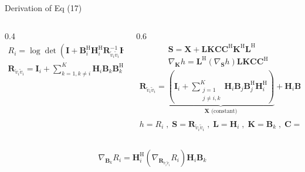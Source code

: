 \documentclass[aspectratio=169, 10pt]{beamer}
\begin{document}
\begin{frame}[label=app-wsr_Ri2]{Derivation of Eq (17)}
    \begin{columns}
        \begin{column}{0.4\paperwidth}
            \begin{align*}
                R_i = \log \det \left(\mathbf{I} + \mathbf{B}_i^\mathrm{H} \mathbf{H}_i^\mathrm{H} \mathbf{R}_{\tilde{v}_i\tilde{v}_i}^{-1} \mathbf{H}_i \mathbf{B}_i\right) \\
                \mathbf{R}_{\tilde{v}_i \tilde{v}_i}=\mathbf{I}_i+\sum_{k=1, k \neq i}^K \mathbf{H}_i \mathbf{B}_k \mathbf{B}_k^{\mathrm{H}} \mathbf{H}_i^{\mathrm{H}}
            \end{align*}
        \end{column}
        \begin{column}{0.6\paperwidth}
            \begin{align*}
                \mathbf{S} = \mathbf{X}+\mathbf{L}\mathbf{K}\mathbf{C}\mathbf{C}^\mathrm{H}\mathbf{K}^\mathrm{H}\mathbf{L}^\mathrm{H} \\
                \nabla_{\mathbf{K}}h = \mathbf{L}^\mathrm{H}\left(\nabla_\mathbf{S}h\right)\mathbf{L}\mathbf{K}\mathbf{C}\mathbf{C}^\mathrm{H}
            \end{align*}
            \begin{align*}
                \mathbf{R}_{\tilde{v}_i \tilde{v}_i} =
                \underbrace{ \left( \mathbf{I}_i + \sum_{\substack{j=1 \\ j \neq i, k}}^K \mathbf{H}_i \mathbf{B}_j \mathbf{B}_j^{\mathrm{H}} \mathbf{H}_i^{\mathrm{H}} \right) }_{\mathbf{X} \textrm{ (constant)}} + \mathbf{H}_i \mathbf{B}_k \mathbf{I} \mathbf{B}_k^{\mathrm{H}} \mathbf{H}_i^{\mathrm{H}} \\
                h = R_i\;,\;
                \mathbf{S}= \mathbf{R}_{\tilde{v}_i\tilde{v}_i} \;,\;
                \mathbf{L} = \mathbf{H}_i \;,\;
                \mathbf{K} = \mathbf{B}_k \;,\;
                \mathbf{C} = \mathbf{C}^\mathrm{H} = \mathbf{I}
            \end{align*}
        \end{column}
    \end{columns}
    \vspace{3ex}
    \begin{equation}
        \nabla_{\mathbf{B}_{k}}R_{i}=\mathbf{H}_i^{\mathrm{H}}\left(
        \nabla_{\mathbf{R}_{\tilde{v}_i\tilde{v}_i}}R_{i}\right)\mathbf{H}_{i}\mathbf{B}_{k} \tag{15}
    \end{equation}
\end{frame}
\end{document}
